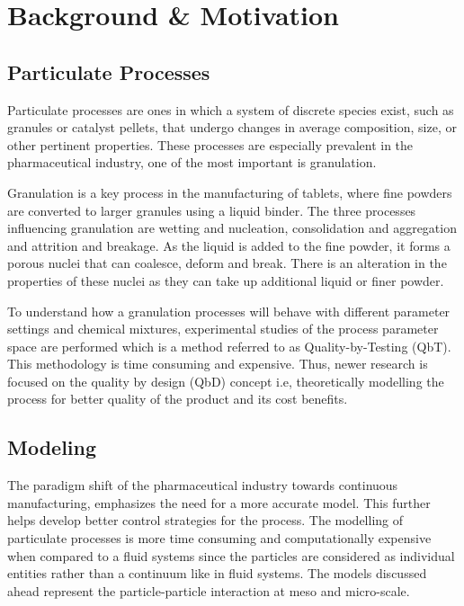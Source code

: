 \documentclass[preprint,11pt,authoryear]{elsarticle}
\begin{document}
\section{Background \& Motivation}

\subsection{Particulate Processes}
      \par Particulate processes are ones in which a system of discrete species exist, such as granules 
      or catalyst pellets, that undergo changes in average composition, size, or other pertinent 
      properties. These processes are especially prevalent in the pharmaceutical industry, one of the 
      most important is granulation.       \par Granulation is a key process in the manufacturing of tablets, 
      where fine powders are converted to larger granules using a liquid binder. The three processes 
      influencing granulation are wetting and nucleation, consolidation and aggregation and attrition and 
      breakage\citep{Iveson2001}\citep{Cameron2005}. As the liquid is added to the fine powder, it 
      forms a porous nuclei that can coalesce, deform and break\citep{Barrasso2015ces}. There is an 
      alteration in the properties of these nuclei as they can take up additional liquid or finer powder.
      \par To understand how a granulation processes will behave with different parameter settings and 
      chemical mixtures, experimental studies of the process parameter space are performed which is a 
      method referred to as Quality-by-Testing (QbT). This methodology is time consuming and 
      expensive. Thus, newer research is focused on the quality by design (QbD) concept i.e, 
      theoretically modelling the process for better quality of the product and its cost benefits. 

\subsection{Modeling}
\par The paradigm shift of the pharmaceutical industry towards continuous manufacturing, 
emphasizes the need for a more accurate model. This further helps develop better control strategies 
for the process. The modelling of particulate processes is more time consuming and computationally 
expensive when compared to a fluid systems since the particles are considered as individual entities 
rather than a continuum like in fluid systems. The models discussed ahead represent the 
particle-particle interaction at meso and micro-scale.
\end{document}
